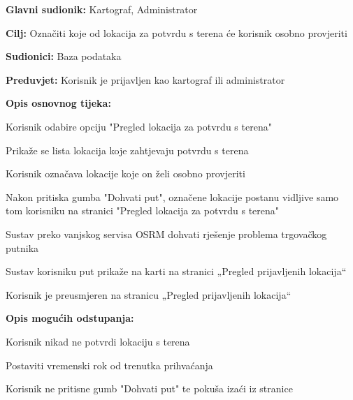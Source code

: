 \noindent {}
\begin{packed_item}
	
	\item \textbf{Glavni sudionik: }Kartograf, Administrator
	\item  \textbf{Cilj:} Označiti koje od lokacija za potvrdu s terena će korisnik osobno provjeriti
	\item  \textbf{Sudionici:} Baza podataka
	\item  \textbf{Preduvjet:} Korisnik je prijavljen kao kartograf ili administrator
	\item  \textbf{Opis osnovnog tijeka:}
	
	\item[] \begin{packed_enum}
		
		\item Korisnik odabire opciju "Pregled lokacija za potvrdu s terena"
		\item Prikaže se lista lokacija koje zahtjevaju potvrdu s terena
		\item Korisnik označava lokacije koje on želi osobno provjeriti
		\item Nakon pritiska gumba "Dohvati put", označene lokacije postanu vidljive samo tom korisniku na stranici "Pregled lokacija za potvrdu s terena"
		\item Sustav preko vanjskog servisa OSRM dohvati rješenje problema trgovačkog putnika
		\item Sustav korisniku put prikaže na karti na stranici „Pregled prijavljenih lokacija“
		\item Korisnik je preusmjeren na stranicu „Pregled prijavljenih lokacija“
	\end{packed_enum}	
	
	\item  \textbf{Opis mogućih odstupanja:}
	
	\item[] \begin{packed_item}
		
		\item[3.a] Korisnik nikad ne potvrdi lokaciju s terena
		\item[] \begin{packed_enum}
			
			\item Postaviti vremenski rok od trenutka prihvaćanja
			
		\end{packed_enum}
		\item[4.a] Korisnik ne pritisne gumb "Dohvati put" te pokuša izaći iz stranice
		\item[] \begin{packed_enum}
			

\end{packed_enum}
\end{packed_item}
\end{packed_item}
